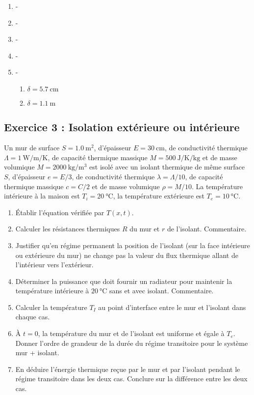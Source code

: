 \begin{enumerate}
	\item -
	\item -
	\item -
	\item -
	\item -
	\begin{enumerate}
		\item $\delta = \SI{5.7}{\centi\meter}$
		\item $\delta = \SI{1.1}{\meter}$
	\end{enumerate}
\end{enumerate}


\subsection{Exercice 3 : Isolation extérieure ou intérieure}

Un mur de surface $S = \SI{1.0}{\meter\squared}$, d'épaisseur $E = \SI{30}{\cm}$, de conductivité thermique $\Lambda = \SI{1}{\watt\per\meter\per\kelvin}$, de capacité thermique massique $M = \SI{500}{\joule\per\kelvin\per\kilogram}$ et de masse volumique $M = \SI{2000}{\kg\per\cubic\meter}$ est isolé avec un isolant thermique de même surface $S$, d'épaisseur $e = E/3$, de conductivité thermique $\lambda = \Lambda/10$, de capacité thermique massique $c = C/2$ et de masse volumique $\rho = M/10$. La température intérieure à la maison est $T_i = \SI{20}{\degreeCelsius}$, la température extérieure est $T_e = \SI{10}{\degreeCelsius}$.

\begin{enumerate}
	\item Établir l'équation vérifiée par $T(x, t)$.
	\item Calculer les résistances thermiques $R$ du mur et $r$ de l'isolant. Commentaire.
	\item Justifier qu'en régime permanent la position de l'isolant (sur la face intérieure ou extérieure du mur) ne change pas la valeur du flux thermique allant de l'intérieur vers l'extérieur.
	\item Déterminer la puissance que doit fournir un radiateur pour maintenir la température intérieure à $\SI{20}{\degreeCelsius}$ sans et avec isolant. Commentaire.
	\item Calculer la température $T_I$ au point d'interface entre le mur et l'isolant dans chaque cas.
	\item À $t=0$, la température du mur et de l'isolant est uniforme et égale à $T_e$. Donner l'ordre de grandeur de la durée du régime transitoire pour le système {mur + isolant}.
	\item En déduire l'énergie thermique reçue par le mur et par l'isolant pendant le régime transitoire dans les  deux cas. Conclure sur la différence entre les deux cas.
\end{enumerate}

